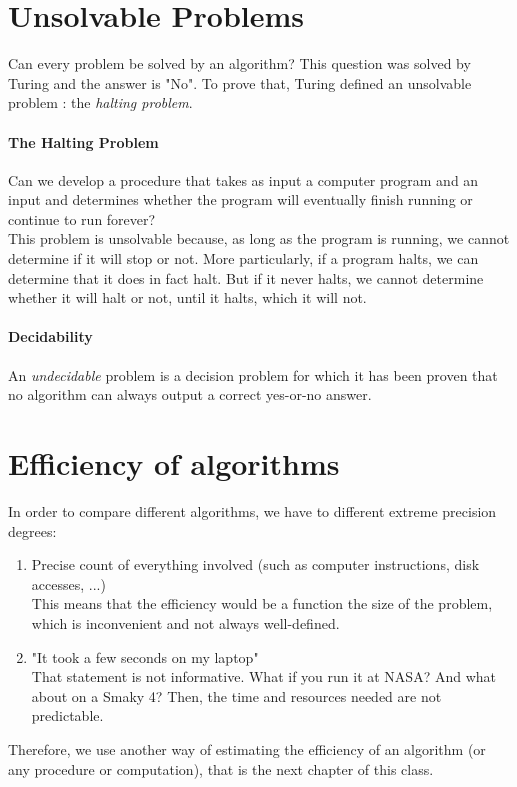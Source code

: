 \documentclass[10pt,a4paper]{book}
\newcommand{\ind}{\hspace*{\parindent}}
\begin{document}
\section{Unsolvable Problems}
Can every problem be solved by an algorithm? This question was solved by Turing and the answer is "No". To prove that, Turing defined an unsolvable problem : the \textit{halting problem}.
\paragraph*{The Halting Problem}
$\ $\\
\ind Can we develop a procedure that takes as input a computer program and an input and determines whether the program will eventually finish running or continue to run forever?\\
\ind This problem is unsolvable because, as long as the program is running, we cannot determine if it will stop or not. More particularly, if a program halts, we can determine that it does in fact halt. But if it never halts, we cannot determine whether it will halt or not, until it halts, which it will not.
\paragraph*{Decidability}
An \textit{undecidable} problem is a decision problem for which it has been proven that no algorithm can always output a correct yes-or-no answer.

\section{Efficiency of algorithms}
In order to compare different algorithms, we have to different extreme precision degrees:
\begin{enumerate}
\item Precise count of everything involved (such as computer instructions, disk accesses, ...)\\
This means that the efficiency would be a function the size of the problem, which is inconvenient and not always well-defined.
\item "It took a few seconds on my laptop"\\
That statement is not informative. What if you run it at NASA? And what about on a Smaky 4? Then, the time and resources needed are not predictable.
\end{enumerate}
Therefore, we use another way of estimating the efficiency of an algorithm (or any procedure or computation), that is the next chapter of this class.
\end{document}
